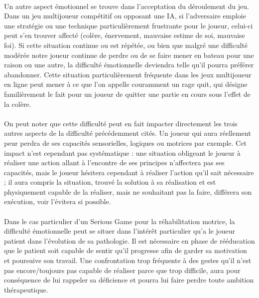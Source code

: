 \paragraph{}
Un autre aspect émotionnel se trouve dans l’acceptation du déroulement du jeu. Dans un jeu multijoueur compétitif ou opposant une IA, si l’adversaire emploie une stratégie ou une technique particulièrement frustrante pour le joueur, celui-ci peut s’en trouver affecté (colère, énervement, mauvaise estime de soi, mauvaise foi). Si cette situation continue ou est répétée, ou bien que malgré une difficulté modérée notre joueur continue de perdre ou de se faire mener en bateau pour une raison ou une autre, la difficulté émotionnelle deviendra telle qu’il pourra préférer abandonner. Cette situation particulièrement fréquente dans les jeux multijoueur en ligne peut mener à ce que l’on appelle couramment un rage quit, qui désigne familièrement le fait pour un joueur de quitter une partie en cours sous l'effet de la colère.

\paragraph{}On peut noter que cette difficulté peut en fait impacter directement les trois autres aspects de la difficulté précédemment cités. Un joueur qui aura réellement peur perdra de ses capacités sensorielles, logiques ou motrices par exemple. Cet impact n’est cependant pas systématique : une situation obligeant le joueur à réaliser une action allant à l’encontre de ses principes n’affectera pas ses capacités, mais le joueur hésitera cependant à réaliser l’action qu’il sait nécessaire ; il aura compris la situation, trouvé la solution à sa réalisation et est physiquement capable de la réaliser, mais ne souhaitant pas la faire, différera son exécution, voir l’évitera si possible.

\paragraph{}Dans le cas particulier d’un Serious Game pour la réhabilitation motrice, la difficulté émotionnelle peut se situer dans l’intérêt particulier qu’a le joueur patient dans l’évolution de sa pathologie. Il est nécessaire en phase de rééducation que le patient soit capable de sentir qu’il progresse afin de garder sa motivation et poursuive son travail. Une confrontation trop fréquente à des gestes qu’il n’est pas encore/toujours pas capable de réaliser parce que trop difficile, aura pour conséquence de lui rappeler sa déficience et pourra lui faire perdre toute ambition thérapeutique.
		
